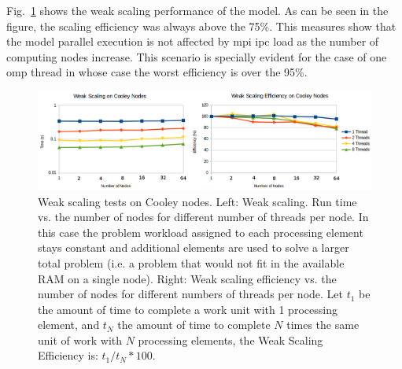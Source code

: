\documentclass[11pt,a4paper]{article}
\begin{document}
Fig.~\ref{fig:Weak_Scaling} shows the weak scaling performance of the model. As can be seen in the figure, the scaling efficiency was always above the 75\%. This measures show that the model parallel execution is not affected by \gls{mpi} \gls{ipc} load as the number of computing nodes increase. This scenario is specially evident for the case of one \gls{omp} thread in whose case the worst efficiency is over the 95\%.


\begin{figure}[h!]
    \centering
    \includegraphics[width=1.0\textwidth]{Weak_Scaling.png}
    \caption{Weak scaling tests on Cooley nodes. Left: Weak scaling. Run time vs. the number of nodes for different number of threads per node. In this case the problem workload assigned to each processing element stays constant and additional elements are used to solve a larger total problem (i.e. a problem that would not fit in the available RAM on a single node). Right: Weak scaling efficiency vs. the number of nodes for different numbers of threads per node. Let $t_1$ be the amount of time to complete a work unit with 1 processing element, and $t_N$ the amount of time to complete $N$ times the same unit of work with $N$ processing elements, the Weak Scaling Efficiency is: $t_1 / t_N * 100$.}
    \label{fig:Weak_Scaling}
\end{figure}


\end{document}
